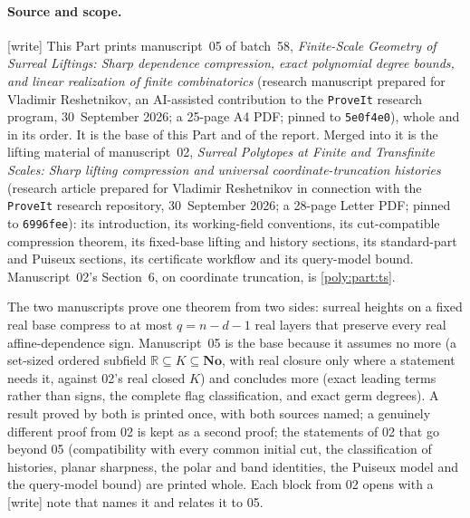 \documentclass[11pt,a4paper]{article}
\numberwithin{equation}{section}
\theoremstyle{plain}
\newcommand{\wtag}{\textup{[write]}}%
\newcommand{\No}{\mathbf{No}}
\newcommand{\R}{\mathbb R}
\newcommand{\repo}{\texttt{ProveIt}}
\begin{document}
\paragraph{Source and scope.} \wtag{} This Part prints manuscript~05 of
batch~58, \emph{Finite-Scale Geometry of Surreal Liftings: Sharp
dependence compression, exact polynomial degree bounds, and linear
realization of finite combinatorics} (research manuscript prepared for
Vladimir Reshetnikov, an AI-assisted contribution to the \repo{} research
program, 30~September 2026; a 25-page A4 PDF; pinned to \texttt{5e0f4e0}),
whole and in its order. It is the base of this Part and of the report.
Merged into it is the lifting material of manuscript~02, \emph{Surreal
Polytopes at Finite and Transfinite Scales: Sharp lifting compression and
universal coordinate-truncation histories} (research article prepared for
Vladimir Reshetnikov in connection with the \repo{} research repository,
30~September 2026; a 28-page Letter PDF; pinned to \texttt{6996fee}): its
introduction, its working-field conventions, its cut-compatible compression
theorem, its fixed-base lifting and history sections, its standard-part and
Puiseux sections, its certificate workflow and its query-model bound.
Manuscript~02's Section~6, on coordinate truncation, is \cref{poly:part:ts}.

The two manuscripts prove one theorem from two sides: surreal heights on a
fixed real base compress to at most $q=n-d-1$ real layers that preserve
every real affine-dependence sign. Manuscript~05 is the base because it
assumes no more (a set-sized ordered subfield $\R\subseteq K\subseteq\No$,
with real closure only where a statement needs it, against 02's real closed
$K$) and concludes more (exact leading terms rather than signs, the complete
flag classification, and exact germ degrees). A result proved by both is
printed once, with both sources named; a genuinely different proof from 02
is kept as a second proof; the statements of 02 that go beyond 05
(compatibility with every common initial cut, the classification of
histories, planar sharpness, the polar and band identities, the Puiseux
model and the query-model bound) are printed whole. Each block from 02 opens
with a \wtag{} note that names it and relates it to 05.
\end{document}
